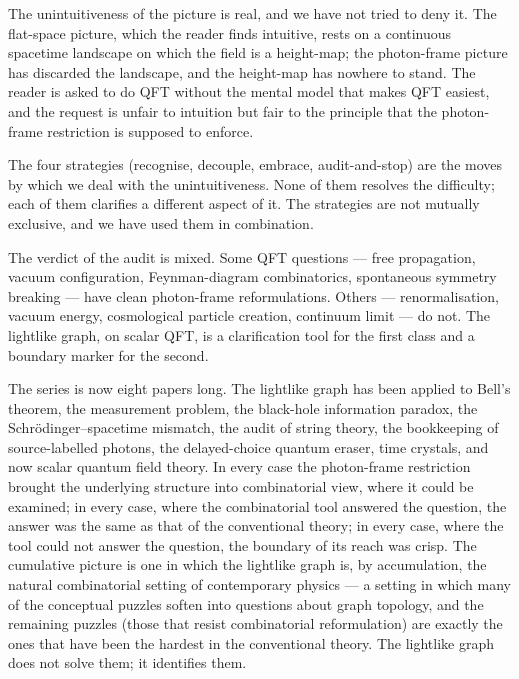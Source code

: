 \documentclass[11pt]{article}
\begin{document}
The unintuitiveness of the picture is real, and we have not tried to deny it. The flat-space picture, which the reader finds intuitive, rests on a continuous spacetime landscape on which the field is a height-map; the photon-frame picture has discarded the landscape, and the height-map has nowhere to stand. The reader is asked to do QFT without the mental model that makes QFT easiest, and the request is unfair to intuition but fair to the principle that the photon-frame restriction is supposed to enforce.

The four strategies (recognise, decouple, embrace, audit-and-stop) are the moves by which we deal with the unintuitiveness. None of them resolves the difficulty; each of them clarifies a different aspect of it. The strategies are not mutually exclusive, and we have used them in combination.

The verdict of the audit is mixed. Some QFT questions --- free propagation, vacuum configuration, Feynman-diagram combinatorics, spontaneous symmetry breaking --- have clean photon-frame reformulations. Others --- renormalisation, vacuum energy, cosmological particle creation, continuum limit --- do not. The lightlike graph, on scalar QFT, is a clarification tool for the first class and a boundary marker for the second.

The series is now eight papers long. The lightlike graph has been applied to Bell's theorem, the measurement problem, the black-hole information paradox, the Schr\"odinger--spacetime mismatch, the audit of string theory, the bookkeeping of source-labelled photons, the delayed-choice quantum eraser, time crystals, and now scalar quantum field theory. In every case the photon-frame restriction brought the underlying structure into combinatorial view, where it could be examined; in every case, where the combinatorial tool answered the question, the answer was the same as that of the conventional theory; in every case, where the tool could not answer the question, the boundary of its reach was crisp. The cumulative picture is one in which the lightlike graph is, by accumulation, the natural combinatorial setting of contemporary physics --- a setting in which many of the conceptual puzzles soften into questions about graph topology, and the remaining puzzles (those that resist combinatorial reformulation) are exactly the ones that have been the hardest in the conventional theory. The lightlike graph does not solve them; it identifies them.
\end{document}
